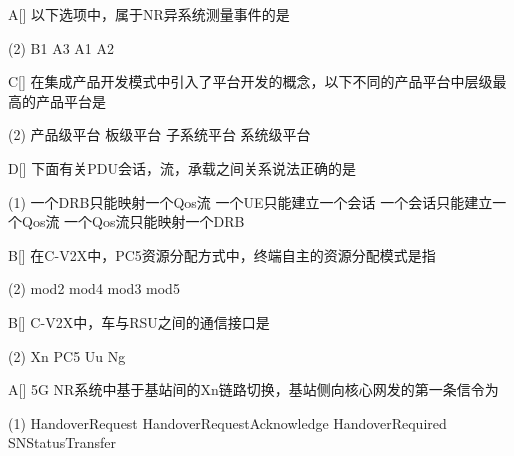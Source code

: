 \begin{choice}{A}[]
    以下选项中，属于NR异系统测量事件的是
    \begin{tasks}(2)
        \task B1
        \task A3
        \task A1
        \task A2
    \end{tasks}
\end{choice}

\begin{choice}{C}[]
    在集成产品开发模式中引入了平台开发的概念，以下不同的产品平台中层级最高的产品平台是
    \begin{tasks}(2)
        \task 产品级平台
        \task 板级平台
        \task  子系统平台
        \task 系统级平台
    \end{tasks}
\end{choice}


\begin{choice}{D}[]
    下面有关PDU会话，流，承载之间关系说法正确的是
    \begin{tasks}(1)
        \task 一个DRB只能映射一个Qos流
        \task 一个UE只能建立一个会话
        \task 一个会话只能建立一个Qos流
        \task 一个Qos流只能映射一个DRB
    \end{tasks}
\end{choice}


\begin{choice}{B}[]
    在C-V2X中，PC5资源分配方式中，终端自主的资源分配模式是指
    \begin{tasks}(2)
        \task mod2
        \task mod4
        \task mod3
        \task mod5
    \end{tasks}
\end{choice}



\begin{choice}{B}[]
    C-V2X中，车与RSU之间的通信接口是
    \begin{tasks}(2)
        \task Xn
        \task PC5
        \task Uu
        \task Ng
    \end{tasks}
\end{choice}


\begin{choice}{A}[]
    5G NR系统中基于基站间的Xn链路切换，基站侧向核心网发的第一条信令为
    \begin{tasks}(1)
        \task HandoverRequest
        \task HandoverRequestAcknowledge
        \task HandoverRequired
        \task SNStatusTransfer
    \end{tasks}
\end{choice}


